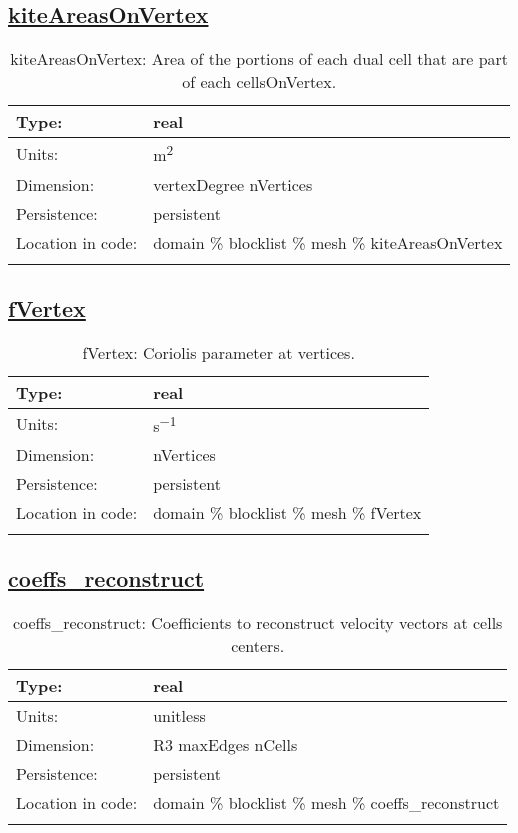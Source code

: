 \subsection[kiteAreasOnVertex]{\hyperref[sec:var_tab_mesh]{kiteAreasOnVertex}}
\label{subsec:var_sec_mesh_kiteAreasOnVertex}
\begin{center}
\begin{longtable}{| p{2.0in} | p{4.0in} |}
        \hline 
        Type: & real \\
        \hline 
        Units: & \si{m^2} \\
        \hline 
        Dimension: & vertexDegree nVertices \\
        \hline 
        Persistence: & persistent \\
        \hline 
         Location in code: & domain \% blocklist \% mesh \% kiteAreasOnVertex \\
         \hline 
    \caption{kiteAreasOnVertex: Area of the portions of each dual cell that are part of each cellsOnVertex.}
\end{longtable}
\end{center}
\subsection[fVertex]{\hyperref[sec:var_tab_mesh]{fVertex}}
\label{subsec:var_sec_mesh_fVertex}
\begin{center}
\begin{longtable}{| p{2.0in} | p{4.0in} |}
        \hline 
        Type: & real \\
        \hline 
        Units: & \si{s^{-1}} \\
        \hline 
        Dimension: & nVertices \\
        \hline 
        Persistence: & persistent \\
        \hline 
         Location in code: & domain \% blocklist \% mesh \% fVertex \\
         \hline 
    \caption{fVertex: Coriolis parameter at vertices.}
\end{longtable}
\end{center}
\subsection[coeffs\_reconstruct]{\hyperref[sec:var_tab_mesh]{coeffs\_reconstruct}}
\label{subsec:var_sec_mesh_coeffs_reconstruct}
\begin{center}
\begin{longtable}{| p{2.0in} | p{4.0in} |}
        \hline 
        Type: & real \\
        \hline 
        Units: & \si{unitless} \\
        \hline 
        Dimension: & R3 maxEdges nCells \\
        \hline 
        Persistence: & persistent \\
        \hline 
         Location in code: & domain \% blocklist \% mesh \% coeffs\_reconstruct \\
         \hline 
    \caption{coeffs\_reconstruct: Coefficients to reconstruct velocity vectors at cells centers.}
\end{longtable}
\end{center}
